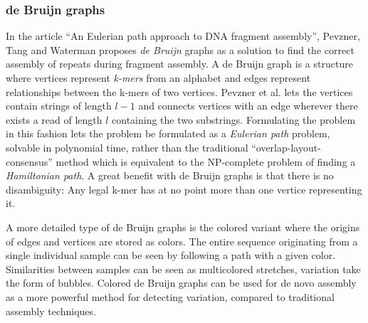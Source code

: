 \documentclass[thesis.tex]{subfiles}
\begin{document}
\subsubsection{de Bruijn graphs}
In the article ``An Eulerian path approach to DNA fragment assembly''\cite{an_eulerian_path_approach_to_dna_fragment_assembly}, Pevzner, Tang and Waterman proposes \textit{de Bruijn} graphs as a solution to find the correct assembly of repeats during fragment assembly. A de Bruijn graph is a structure where vertices represent \textit{k-mers} from an alphabet and edges represent relationships between the k-mers of two vertices. Pevzner et al. lets the vertices contain strings of length $l-1$ and connects vertices with an edge wherever there exists a read of length $l$ containing the two substrings. Formulating the problem in this fashion lets the problem be formulated as a \textit{Eulerian path} problem, solvable in polynomial time, rather than the traditional ``overlap-layout-consensus'' method which is equivalent to the NP-complete problem of finding a \textit{Hamiltonian path}. A great benefit with de Bruijn graphs is that there is no disambiguity: Any legal k-mer has at no point more than one vertice representing it. \\
\clearpage
\par\noindent
A more detailed type of de Bruijn graphs is the colored variant where the origins of edges and vertices are stored as colors. The entire sequence originating from a single individual sample can be seen by following a path with a given color. Similarities between samples can be seen as multicolored stretches, variation take the form of bubbles. Colored de Bruijn graphs can be used for de novo assembly as a more powerful method for detecting variation, compared to traditional assembly techniques\cite{de_novo_assembly_and_genotyping_of_variants_using_colored_de_bruijn_graphs}.
\end{document}
